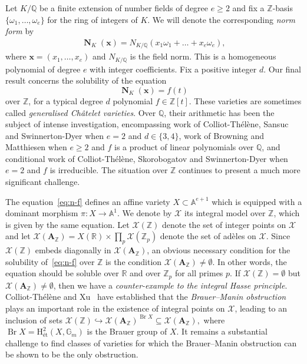 \documentclass[11pt,letterpaper]{amsart}
\renewcommand{\geq}{\geqslant}
\theoremstyle{definition}
\numberwithin{equation}{section}
\renewcommand\AA{\mathbb{A}}
\newcommand\RR{\mathbb{R}}
\newcommand\ZZ{\mathbb{Z}}
\newcommand\QQ{\mathbb{Q}}
\newcommand{\x}{\mathbf{x}}
\newcommand{\cX}{\mathcal{X}}
\DeclareMathOperator{\Br}{Br}
\DeclareMathOperator{\nf}{\mathbf{N}}
\newcommand{\0}{\mathbf{0}}
\begin{document}
Let $K/\QQ$ be a finite  extension of number fields of degree $e\geq 2$ 
and fix a $\ZZ$-basis $\{\omega_1,\dots,\omega_e\}$ for the ring of integers of $K$.
We will denote the corresponding {\em norm form} by
\begin{align}\label{eq:norms}
\nf_K(\x)=
N_{K/\QQ}(x_1\omega_1+\dots+x_e\omega_e),
\end{align}
where
$\x=(x_1,\dots,x_e)$ and 
 $N_{K/\QQ}$ is the field norm.
This is a homogeneous
polynomial of degree $e$ with integer coefficients.
Fix a positive integer  $d$. 
Our final result concerns the solubility of the equation
\begin{equation}\label{eq:n-f}
\nf_K(\x)=f(t)
\end{equation}
over $\ZZ$, for a typical   degree $d$ polynomial
$f\in \ZZ[t]$. These varieties are sometimes called \emph{generalised Ch\^atelet varieties}.
Over $\QQ$, their arithmetic has been the subject of intense investigation, encompassing work of 
Colliot-Th\'el\`ene, Sansuc and Swinnerton-Dyer \cite{crelle1,crelle2} when $e=2$ and $d\in \{3,4\}$, 
work of 
 Browning and Matthiesen \cite{nf} when $e\geq 2$ and $f$ is a product of linear polynomials over $\QQ$, and 
 conditional work of 
Colliot-Th\'el\`ene,  Skorobogatov and Swinnerton-Dyer \cite{lead} when 
 $e=2$ and $f$ is irreducible. The situation over $\ZZ$ continues to 
present a much more  significant challenge.

The equation~\eqref{eq:n-f} defines an affine variety $X\subset \AA^{e+1}$ which
is equipped with a dominant morphism $\pi:X\to \AA^1$. We denote by $\mathcal{X}$  its integral model over $\ZZ$, which is given by the same equation. Let $\mathcal{X}(\ZZ)$ denote the set of integer points on $\mathcal{X}$ and let  
$\mathcal{X}(\mathbf{A}_\ZZ)=X(\RR)\times \prod_p \mathcal{X}(\ZZ_p)$ denote the set of ad\`eles on $\mathcal{X}$.  Since $\mathcal{X}(\ZZ)$ embeds diagonally in 
$\mathcal{X}(\mathbf{A}_\ZZ)$, an obvious 
 necessary condition for the solubility of~\eqref{eq:n-f}  over $\ZZ$ is the condition
$\mathcal{X}(\mathbf{A}_\ZZ)\neq \emptyset$. In other words,
the   equation  should be soluble over $\RR$ and over $\ZZ_p$ for all primes $p$. 
If $\cX(\ZZ)=\emptyset$ but 
$\mathcal{X}(\mathbf{A}_\ZZ)\neq \emptyset$, then we have a {\em counter-example to the integral Hasse principle}. Colliot-Th\'el\`ene and Xu~\cite{xu} have established that the {\em Brauer--Manin obstruction} plays an important role in  the existence of integral points on $\mathcal{X}$, leading to an inclusion of sets
$
\mathcal{X}(\ZZ)\hookrightarrow \mathcal{X}(\mathbf{A}_\ZZ)^{\Br X}\subseteq \mathcal{X}(\mathbf{A}_\ZZ),
$
where $\Br X=\mathrm{H}_{\text{\'et}}^2(X,\mathbb{G}_m)$ is the Brauer group of $X$.
It remains a substantial  challenge to find classes of varieties for which the 
Brauer--Manin obstruction can be shown to be the only obstruction. 
\end{document}
